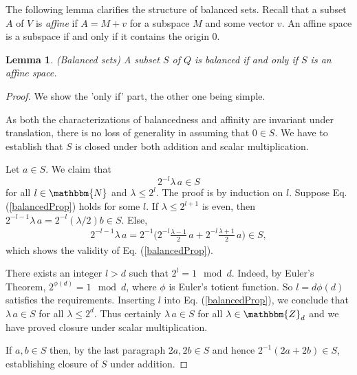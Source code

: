 \documentclass[aps,twocolumn,floatfix]{revtex4}
\newtheorem{lemma}[theorem]{Lemma}
\def\ZZ{\mathbbm{Z}}
\def\NN{\mathbbm{N}}
\begin{document}
The following lemma clarifies the structure of balanced sets.  Recall
that a subset $A$ of $V$ is \emph{affine} if $A=M+v$ for a subspace
$M$ and some vector $v$. An affine space is a subspace if and only if
it contains the origin $0$.  

\begin{lemma}\label{lmBalancedSets}
	\emph{(Balanced sets)}
	A subset $S$ of $Q$ is balanced if and only if $S$ is an affine
	space.
\end{lemma}

\begin{proof}
	We show the 'only if' part, the other one being simple.  
	
	As both the characterizations of balancedness and affinity are
	invariant under translation, there is no loss of generality in
	assuming that $0\in S$. We have to establish that $S$ is closed
	under both addition and scalar multiplication.
	
	Let $a\in S$.  We claim that
	\begin{equation}\label{balancedProp}
		2^{-l}\lambda \,a \in S
	\end{equation}
	for all $l\in \NN$ and $\lambda\leq2^l$. The proof is by induction on $l$.
	Suppose Eq.  (\ref{balancedProp}) holds for some $l$. If
	$\lambda \leq 2^{l+1}$ is even, then $2^{-l-1}\lambda\,a=
	2^{-l}(\lambda/2)b\in S$. Else, 
	\begin{eqnarray*}
		2^{-l-1} \lambda\, a 
		= 
		2^{-1}\big( 2^{-l} \frac{\lambda-1}2\, a + 2^{-l} \frac{\lambda+1}2\,a \big)
		\in S,
	\end{eqnarray*} 
	which shows the validity of Eq. (\ref{balancedProp}).

	There exists an integer $l>d$ such that $2^l = 1 \mod d$.  Indeed,
	by Euler's Theorem, $2^{\phi(d)}=1 \mod d$,  where $\phi$ is
	Euler's totient function. So $l=d \phi(d)$ satisfies the
	requirements.
	Inserting $l$ into Eq. (\ref{balancedProp}), we conclude that
	$\lambda\, a \in S$ for all $\lambda \leq 2^d$. Thus certainly
	$\lambda\,a \in S$ for all $\lambda \in \ZZ_d$ and we have proved
	closure under scalar multiplication. 
	
	If $a,b\in S$ then, by the last paragraph $2a,2b \in S$ and hence
	$2^{-1}(2a+2b)\in S$, establishing closure of $S$ under addition.
\end{proof}
\end{document}
